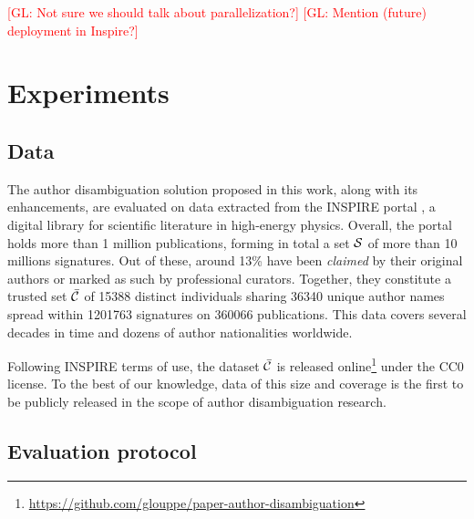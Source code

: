 \documentclass{article}
\newcommand{\glnote}[1]{\textcolor{red}{[GL: #1]}}
\begin{document}
\glnote{Not sure we should talk about parallelization?}
\glnote{Mention (future) deployment in Inspire?}




\section{Experiments}
\label{experiments}

\subsection{Data}

The author disambiguation solution proposed in this work, along with its
enhancements, are evaluated on data extracted from the INSPIRE portal
\citep{gentil2009information}, a digital library for scientific literature in
high-energy physics. Overall, the portal holds more than 1 million
publications, forming in total a set ${\cal S}$ of more than 10 millions
signatures. Out of these, around 13\% have been \textit{claimed} by their
original authors or marked as such by professional curators. Together, they
constitute a trusted set $\bar{\cal C}$ of 15388 distinct individuals sharing
36340 unique author names spread within 1201763 signatures on 360066
publications. This data covers several decades in time and dozens of author
nationalities worldwide.

Following INSPIRE terms of use, the dataset $\bar{\cal C}$ is released
online\footnote{\url{https://github.com/glouppe/paper-author-disambiguation}}
under the CC0 license. To the best of our knowledge, data of this size and
coverage is the first to be publicly released in the scope of author
disambiguation research.

\subsection{Evaluation protocol}
\end{document}
